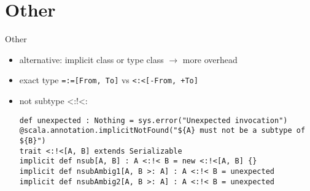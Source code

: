 \documentclass[11pt]{beamer}
\begin{document}
\section{Other} 
\begin{frame}[fragile] {Other}
\begin{itemize}
\item alternative: implicit class or type class $\rightarrow$ more overhead
\item exact type \lstinline{=:=[From, To]} vs \lstinline{<:<[-From, +To]} \pause
\item not subtype \textless:!\textless:
\begin{lstlisting} 
def unexpected : Nothing = sys.error("Unexpected invocation")
@scala.annotation.implicitNotFound("${A} must not be a subtype of ${B}")
trait <:!<[A, B] extends Serializable
implicit def nsub[A, B] : A <:!< B = new <:!<[A, B] {}
implicit def nsubAmbig1[A, B >: A] : A <:!< B = unexpected
implicit def nsubAmbig2[A, B >: A] : A <:!< B = unexpected
\end{lstlisting} 
\end{itemize}
\end{frame}
\end{document}
